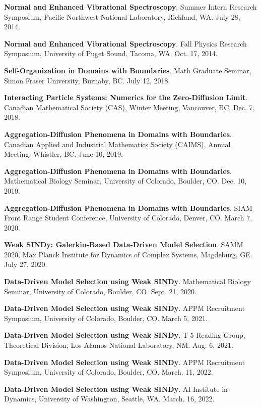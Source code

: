 \documentclass[letterpaper,11pt,oneside]{article}
\begin{document}
\begin{enumerate}[label={[\arabic*]}]
\item \textbf{Normal and Enhanced Vibrational Spectroscopy}. Summer Intern Research Symposium, Pacific Northwest National Laboratory, Richland, WA. July 28, 2014.
\item \textbf{Normal and Enhanced Vibrational Spectroscopy}. Fall Physics Research Symposium, University of Puget Sound, Tacoma, WA. Oct. 17, 2014.
\item \textbf{Self-Organization in Domains with Boundaries}. Math Graduate Seminar, Simon Fraser University, Burnaby, BC. July 12, 2018.
\item \textbf{Interacting Particle Systems: Numerics for the Zero-Diffusion Limit}. Canadian Mathematical Society (CAS), Winter Meeting, Vancouver, BC. Dec. 7, 2018.
\item \textbf{Aggregation-Diffusion Phenomena in Domains with Boundaries}. Canadian Applied and Industrial Mathematics Society (CAIMS), Annual Meeting, Whistler, BC. June 10, 2019.
\item \textbf{Aggregation-Diffusion Phenomena in Domains with Boundaries}. Mathematical Biology Seminar, University of Colorado, Boulder, CO. Dec. 10, 2019.
\item \textbf{Aggregation-Diffusion Phenomena in Domains with Boundaries}. SIAM Front Range Student Conference, University of Colorado, Denver, CO. March 7, 2020.
\item \textbf{Weak SINDy: Galerkin-Based Data-Driven Model Selection}. SAMM 2020, Max Planck Institute for Dynamics of Complex Systems, Magdeburg, GE. July 27, 2020.
\item \textbf{Data-Driven Model Selection using Weak SINDy}. Mathematical Biology Seminar, University of Colorado, Boulder, CO. Sept. 21, 2020.
\item \textbf{Data-Driven Model Selection using Weak SINDy}. APPM Recruitment Symposium, University of Colorado, Boulder, CO. March 5, 2021.
\item \textbf{Data-Driven Model Selection using Weak SINDy}. T-5 Reading Group, Theoretical Division, Los Alamos National Laboratory, NM. Aug. 6, 2021.
\item \textbf{Data-Driven Model Selection using Weak SINDy}. APPM Recruitment Symposium, University of Colorado, Boulder, CO. March. 11, 2022.
\item \textbf{Data-Driven Model Selection using Weak SINDy}. AI Institute in Dynamics, University of Washington, Seattle, WA. March. 16, 2022.
\end{enumerate}
\end{document}
